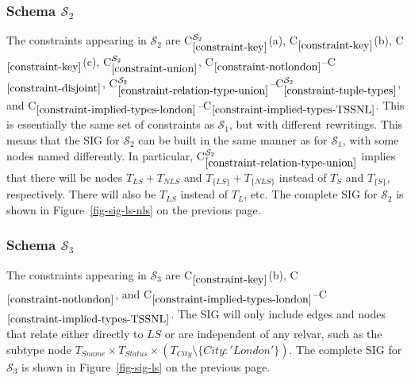 \documentclass{sig-alternate-05-2015}
\newcounter{constraint}
\newcommand{\LS}{\ensuremath{\mathit{LS}}}
\newcommand{\NLS}{\ensuremath{\mathit{NLS}}}
\newcommand{\LSsub}{\ensuremath{\mathit{L}}}
\newcommand{\Sname}{\ensuremath{\mathit{Sname}}}
\newcommand{\Status}{\ensuremath{\mathit{Status}}}
\newcommand{\City}{\ensuremath{\mathit{City}}}
\newcommand{\T}[1]{\ensuremath{T_{#1}}}
\newcommand{\TT}[1]{\ensuremath{T_{\{#1\}}}}
\newcommand{\CityLondon}{\ensuremath{\{\City\colon\allowbreak\mathit{'London'}\}}}
\newcommand{\TCityMinusLondon}{\ensuremath{\T{\City} \setminus \CityLondon}}
\newcommand{\TSSNL}{\ensuremath{\T{\Sname} \times \T{\Status} \times (\TCityMinusLondon)}}
\newcommand{\TLSPlusNLS}{\ensuremath{\T{\LS} + \T{\NLS}}}
\newcommand{\TTLSPlusNLS}{\ensuremath{\TT{\LS} + \TT{\NLS}}}
\newcommand{\SC}[1]{\ensuremath{\mathcal{S}_{#1}}}
\newcommand{\Constraint}[2][]{C\ensuremath{_{#2}\ifx&#1&\else^{#1}\fi}}
\begin{document}




\subsubsection{Schema \(\SC{2}\)}
\label{sec-sigs-s-ii}

\noindent The constraints appearing in \(\SC{2}\) are \Constraint[\SC{2}]{\ref{constraint-key}}(a), \Constraint{\ref{constraint-key}}(b), \Constraint{\ref{constraint-key}}(c), \Constraint[\SC{2}]{\ref{constraint-union}}, \Constraint{\ref{constraint-notlondon}}--\Constraint{\ref{constraint-disjoint}}, \Constraint[\SC{2}]{\ref{constraint-relation-type-union}}--\Constraint[\SC{2}]{\ref{constraint-tuple-types}}, and \Constraint{\ref{constraint-implied-types-london}}--\Constraint{\ref{constraint-implied-types-TSSNL}}. This is essentially the same set of constraints as \(\SC{1}\), but with different rewritings. This means that the SIG for \(\SC{2}\) can be built in the same manner as for \(\SC{1}\), with some nodes named differently. In particular, \Constraint[\SC{2}]{\ref{constraint-relation-type-union}} implies that there will be nodes \(\TLSPlusNLS\) and \(\TTLSPlusNLS\) instead of \(\T{S}\) and \(\TT{S}\), respectively. There will also be \(\T{\LS}\) instead of \(\T{\LSsub}\), etc. The complete SIG for \(\SC{2}\) is shown in Figure~\ref{fig-sig-ls-nls} on the previous page.




\subsubsection{Schema \(\SC{3}\)}
\label{sec-sigs-s-iii}

\noindent The constraints appearing in \(\SC{3}\) are \Constraint{\ref{constraint-key}}(b), \Constraint{\ref{constraint-notlondon}}, and \Constraint{\ref{constraint-implied-types-london}}--\Constraint{\ref{constraint-implied-types-TSSNL}}. The SIG will only include edges and nodes that relate either directly to \(\LS\) or are independent of any relvar, such as the subtype node \(\TSSNL\). The complete SIG for \(\SC{3}\) is shown in Figure~\ref{fig-sig-ls} on the previous page.


\end{document}
